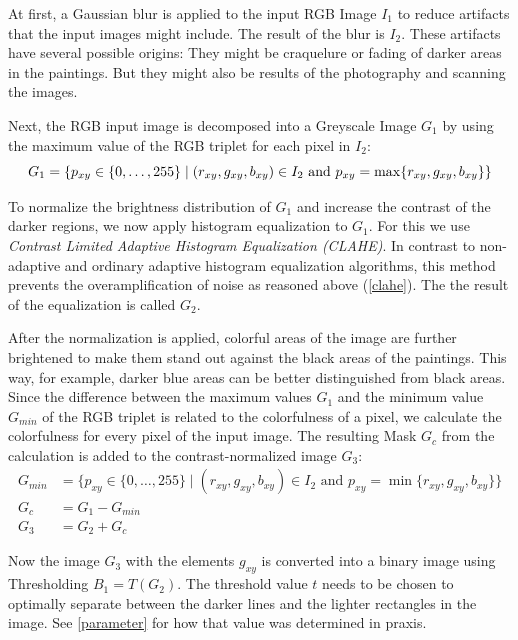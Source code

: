 \documentclass[serif,article,noparskip]{agse-thesis}
\begin{document}
At first, a Gaussian blur is applied to the input RGB Image $I_1$ to reduce
artifacts that the input images might include. The result of the blur is $I_2$.
These artifacts have several possible origins: They might be craquelure or
fading of darker areas in the paintings. But they might also be results of the
photography and scanning the images.

Next, the RGB input image is decomposed into a Greyscale Image $G_1$ by using
the maximum value of the RGB triplet for each pixel in $I_2$:
\begin{equation}
G_1 = \{p_{xy} \in \{0,\ldots,255\} \mid (r_{xy},g_{xy},b_{xy})\in I_2\text{ and }p_{xy}=\max\{r_{xy},g_{xy},b_{xy}\}\}\\
\end{equation}

To normalize the brightness distribution of $G_1$ and increase the contrast of
the darker regions, we now apply histogram equalization to $G_1$. For this we
use \textit{Contrast Limited Adaptive Histogram Equalization (CLAHE)}. In
contrast to non-adaptive and ordinary adaptive histogram equalization
algorithms, this method prevents the overamplification of noise as reasoned
above (\ref{clahe}). The the result of the equalization is called $G_2$. \cite{Pizer1987}

After the normalization is applied, colorful areas of the image are further
brightened to make them stand out against the black areas of the paintings. This
way, for example, darker blue areas can be better distinguished from black
areas. Since the difference between the maximum values $G_1$ and the minimum
value $G_{min}$ of the RGB triplet is related to the colorfulness of a pixel, we
calculate the colorfulness for every pixel of the input image. The resulting
Mask $G_c$ from the calculation is added to the contrast-normalized image
$G_3$:
\begin{align}
G_{min} &= \{p_{xy} \in \{0,\ldots,255\} \mid (r_{xy},g_{xy},b_{xy})\in I_2\text{ and }p_{xy}=\min\{r_{xy},g_{xy},b_{xy}\}\}\\
G_c &= G_1 - G_{min}\\
G_3 &= G_2 + G_c
\end{align}

Now the image $G_3$ with the elements $g_{xy}$ is converted into a binary image
using Thresholding $B_1 = T(G_2)$. The threshold value $t$ needs to be chosen to
optimally separate between the darker lines and the lighter rectangles in the
image. See \ref{parameter} for how that value was determined in praxis.
\end{document}
